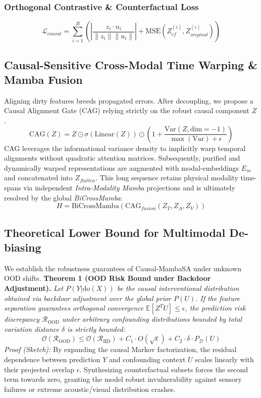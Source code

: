 \documentclass{article}
\begin{document}
\subsubsection{Orthogonal Contrastive \& Counterfactual Loss}
\begin{equation}
    \mathcal{L}_{causal} = \sum_{i=1}^B \left( \left| \frac{z_i \cdot u_i}{\|z_i\| \|u_i\|} \right| + \text{MSE}(Z_{cf}^{(i)}, Z_{original}^{(i)}) \right)
\end{equation}

\subsection{Causal-Sensitive Cross-Modal Time Warping \& Mamba Fusion}
Aligning dirty features breeds propagated errors. After decoupling, we propose a Causal Alignment Gate (CAG) relying strictly on the robust causal component $Z$.
\begin{equation}
    \text{CAG}(Z) = Z \odot \sigma(\text{Linear}(Z)) \odot \left(1 + \frac{\text{Var}(Z, \text{dim}=-1)}{\max(\text{Var}) + \epsilon} \right)
\end{equation}
CAG leverages the informational variance density to implicitly warp temporal alignments without quadratic attention matrices. Subsequently, purified and dynamically warped representations are augmented with modal-embeddings $E_m$ and concatenated into $Z_{flatten}$. This long sequence retains physical modality time-spans via independent \textit{Intra-Modality Mamba} projections and is ultimately resolved by the global \textit{BiCrossMamba}:
\begin{equation}
    H = \text{BiCrossMamba}(\text{CAG}_{fusion}(Z_{T}, Z_{A}, Z_{V}))
\end{equation}

\subsection{Theoretical Lower Bound for Multimodal De-biasing}
We establish the robustness guarantees of Causal-MambaSA under unknown OOD shifts.
\vspace{2mm}
\noindent \textbf{Theorem 1 (OOD Risk Bound under Backdoor Adjustment).} \textit{Let $P(Y|\text{do}(X))$ be the causal interventional distribution obtained via backdoor adjustment over the global prior $P(U)$. If the feature separation guarantees orthogonal convergence $\mathbb{E}[Z^T U] \le \epsilon$, the prediction risk discrepancy $\mathcal{R}_{\text{OOD}}$ under arbitrary confounding distributions bounded by total variation distance $\delta$ is strictly bounded:}
\begin{equation}
    \mathcal{O}(\mathcal{R}_{\text{OOD}}) \leq \mathcal{O}(\mathcal{R}_{\text{IID}}) + C_1 \cdot O(\sqrt{\epsilon}) + C_2 \cdot \delta \cdot P_{\mathcal{D}}(U)
\end{equation}
\textit{Proof (Sketch):} By expanding the causal Markov factorization, the residual dependence between prediction $Y$ and confounding context $U$ scales linearly with their projected overlap $\epsilon$. Synthesizing counterfactual subsets forces the second term towards zero, granting the model robust invulnerability against sensory failures or extreme acoustic/visual distribution crashes.
\end{document}
